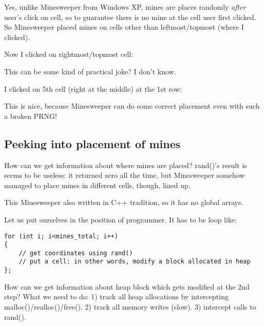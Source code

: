 \begin{figure}[H]
\centering
{}
\end{figure}

Yes, unlike Minesweeper from Windows XP, mines are places randomly \emph{after} user's click on cell, so to guarantee
there is no mine at the cell user first clicked.
So Minesweeper placed mines on cells other than leftmost/topmost (where I clicked).

Now I clicked on rightmost/topmost cell:

\begin{figure}[H]
\centering
{}
\end{figure}

This can be some kind of practical joke? I don't know.

I clicked on 5th cell (right at the middle) at the 1st row:

\begin{figure}[H]
\centering
{}
\end{figure}

This is nice, because Minesweeper can do some correct placement even with such a broken \ac{PRNG}!

\subsection{Peeking into placement of mines}

How can we get information about where mines are placed?
rand()'s result is seems to be useless: it returned zero all the time, but Minesweeper somehow managed to place
mines in different cells, though, lined up.

This Minesweeper also written in C++ tradition, so it has no global arrays.

Let us put ourselves in the position of programmer.
It has to be loop like:

\begin{lstlisting}
for (int i; i<mines_total; i++)
{
	// get coordinates using rand()
	// put a cell: in other words, modify a block allocated in heap
};
\end{lstlisting}

How can we get information about heap block which gets modified at the 2nd step?
What we need to do:
1) track all heap allocations by intercepting malloc()/realloc()/free().
2) track all memory writes (slow).
3) intercept calls to rand().

